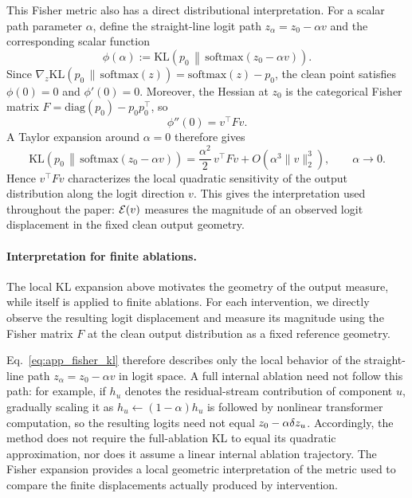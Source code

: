 This Fisher metric also has a direct distributional interpretation.
For a scalar path parameter $\alpha$, define the straight-line logit path
$z_\alpha=z_0-\alpha v$ and the corresponding scalar function
\begin{equation}
\phi(\alpha)
:=
\mathrm{KL}\!\left(
p_0\,\middle\|\,\mathrm{softmax}(z_0-\alpha v)
\right).
\label{eq:app_phi}
\end{equation}
Since
$\nabla_z\mathrm{KL}(p_0\,\|\,\mathrm{softmax}(z))
=\mathrm{softmax}(z)-p_0$,
the clean point satisfies $\phi(0)=0$ and $\phi'(0)=0$.
Moreover, the Hessian at $z_0$ is the categorical Fisher matrix
$F=\mathrm{diag}(p_0)-p_0p_0^\top$, so
\begin{equation}
\phi''(0)
=
v^\top Fv .
\label{eq:app_phi_second}
\end{equation}
A Taylor expansion around $\alpha=0$ therefore gives
\begin{equation}
\mathrm{KL}\!\left(
p_0\,\middle\|\,\mathrm{softmax}(z_0-\alpha v)
\right)
=
\frac{\alpha^2}{2}\,v^\top Fv
+
O(\alpha^3\|v\|_2^3),
\qquad \alpha\to0 .
\label{eq:app_fisher_kl}
\end{equation}
Hence $v^\top Fv$ characterizes the local quadratic sensitivity of the output
distribution along the logit direction $v$.
This gives the interpretation used throughout the paper: $\mathcal{E}(v)$ measures
the magnitude of an observed logit displacement in the fixed clean output geometry.

\paragraph{Interpretation for finite ablations.}
\label{app:softmask}
The local KL expansion above motivates the geometry of the output measure, while
\coax itself is applied to finite ablations.
For each intervention, we directly observe the resulting logit displacement and
measure its magnitude using the Fisher matrix $F$ at the clean output distribution
as a fixed reference geometry.

Eq.~\ref{eq:app_fisher_kl} therefore describes only the local behavior of the
straight-line path $z_\alpha=z_0-\alpha v$ in logit space.
A full internal ablation need not follow this path: for example, if $h_u$ denotes
the residual-stream contribution of component $u$, gradually scaling it as
$h_u\leftarrow(1-\alpha)h_u$ is followed by nonlinear transformer computation,
so the resulting logits need not equal $z_0-\alpha\delta z_u$.
Accordingly, the method does not require the full-ablation KL to equal its
quadratic approximation, nor does it assume a linear internal ablation trajectory.
The Fisher expansion provides a local geometric interpretation of the metric used
to compare the finite displacements actually produced by intervention.

